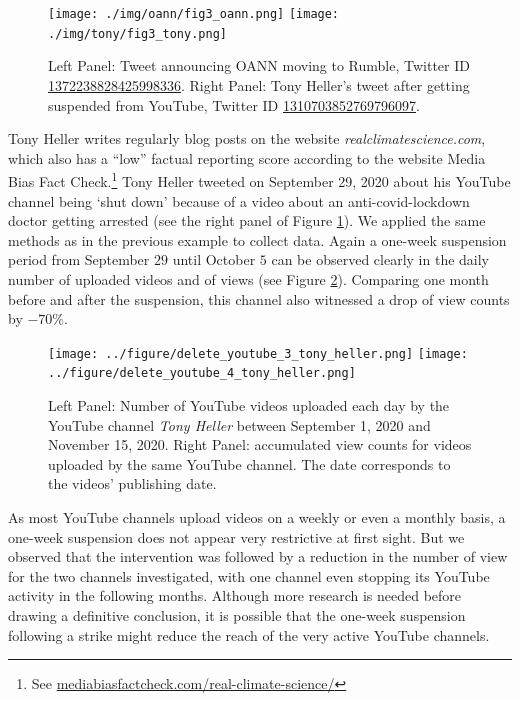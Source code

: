 \documentclass{article}
\begin{document}
\begin{figure}[h]
	\centering
		\texttt{[image: ./img/oann/fig3\_oann.png]}
		\texttt{[image: ./img/tony/fig3\_tony.png]}
	\caption{Left Panel: Tweet announcing OANN moving to Rumble, Twitter ID \href{https://twitter.com/OANN/status/1372238828425998336}{1372238828425998336}. Right Panel: Tony Heller's tweet after getting suspended from YouTube, Twitter ID \href{https://twitter.com/Tony\_Heller/status/1310703852769796097}{1310703852769796097}.}
	\label{tweets_about_yt_suspensions}
\end{figure}

\smallskip

Tony Heller writes regularly blog posts on the website {\it realclimatescience.com}, which also has a ``low'' factual reporting score according to the website Media Bias Fact Check.\footnote{See \href{https://mediabiasfactcheck.com/real-climate-science/}{mediabiasfactcheck.com/real-climate-science/}}
Tony Heller tweeted on September 29, 2020 about his YouTube channel being `shut down' because of a video about an anti-covid-lockdown doctor getting arrested (see the right panel of Figure \ref{tweets_about_yt_suspensions}).
We applied the same methods as in the previous example to collect data.
Again a one-week suspension period from September $29$ until October $5$ can be observed clearly in the daily number of uploaded videos and of views (see Figure \ref{delete_youtube_tony}).
Comparing one month before and after the suspension, this channel also witnessed a drop of view counts by $-70\%$.

\begin{figure}[h]
\hspace{-2em}
			\texttt{[image: ../figure/delete\_youtube\_3\_tony\_heller.png]}
			\texttt{[image: ../figure/delete\_youtube\_4\_tony\_heller.png]}
	\caption{Left Panel: Number of YouTube videos uploaded each day by the YouTube channel {\it Tony Heller} between September 1, 2020 and November 15, 2020. Right Panel: accumulated view counts for videos uploaded by the same YouTube channel. The date corresponds to the videos’  publishing date. 
}
	\label{delete_youtube_tony}
\end{figure}

\smallskip

As most YouTube channels upload videos on a weekly or even a monthly basis, a one-week suspension does not appear very restrictive at first sight. 
But we observed that the intervention was followed by a reduction in the number of view for the two channels investigated, with one channel even stopping its YouTube activity in the following months. 
Although more research is needed before drawing a definitive conclusion, it is possible that the one-week suspension following a strike might reduce the reach of the very active YouTube channels.
\end{document}
